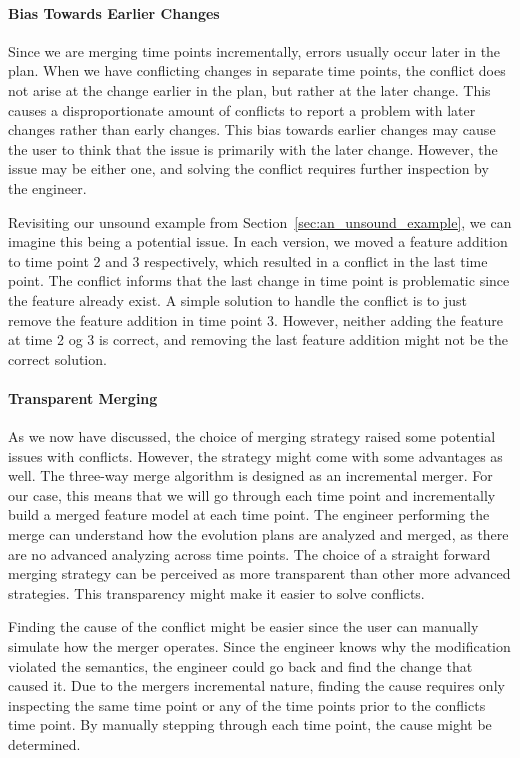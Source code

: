 \documentclass[a4paper,english]{ifimaster}
\begin{document}
\paragraph{Bias Towards Earlier Changes}%
\label{par:bias_towards_earlier_time_points}

Since we are merging time points incrementally, errors usually occur later in the plan. When we have conflicting changes in separate time points, the conflict does not arise at the change earlier in the plan, but rather at the later change. This causes a disproportionate amount of conflicts to report a problem with later changes rather than early changes. This bias towards earlier changes may cause the user to think that the issue is primarily with the later change. However, the issue may be either one, and solving the conflict requires further inspection by the engineer.

Revisiting our unsound example from Section~\vref{sec:an_unsound_example}, we can imagine this being a potential issue. In each version, we moved a feature addition to time point 2 and 3 respectively, which resulted in a conflict in the last time point. The conflict informs that the last change in time point is problematic since the feature already exist. A simple solution to handle the conflict is to just remove the feature addition in time point 3. However, neither adding the feature at time 2 og 3 is correct, and removing the last feature addition might not be the correct solution.

\paragraph{Transparent Merging}%
\label{par:transparent_merging}

As we now have discussed, the choice of merging strategy raised some potential issues with conflicts. However, the strategy might come with some advantages as well. The three-way merge algorithm is designed as an incremental merger. For our case, this means that we will go through each time point and incrementally build a merged feature model at each time point. The engineer performing the merge can understand how the evolution plans are analyzed and merged, as there are no advanced analyzing across time points. The choice of a straight forward merging strategy can be perceived as more transparent than other more advanced strategies. This transparency might make it easier to solve conflicts.

Finding the cause of the conflict might be easier since the user can manually simulate how the merger operates. Since the engineer knows why the modification violated the semantics, the engineer could go back and find the change that caused it. Due to the mergers incremental nature, finding the cause requires only inspecting the same time point or any of the time points prior to the conflicts time point. By manually stepping through each time point, the cause might be determined.
\end{document}
